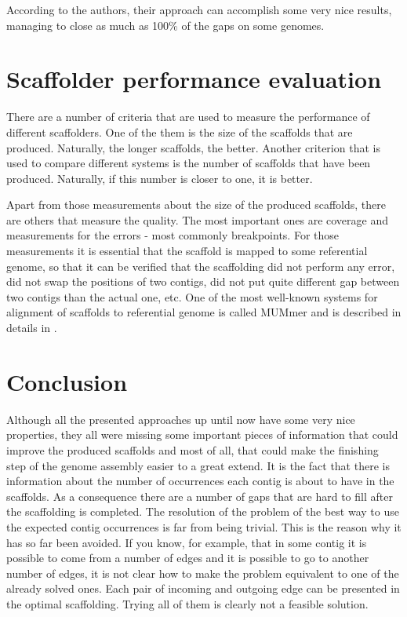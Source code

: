 \documentclass[11pt]{article}
\begin{document}
According to the authors, their approach can accomplish some very nice results,
managing to close as much as 100\% of the gaps on some genomes.


\section{Scaffolder performance evaluation} %
\label{sec:Scaffolder performance evaluation}
There are a number of criteria that are used to measure the performance of
different scaffolders. One of the them is the size of the scaffolds that are
produced. Naturally, the longer scaffolds, the better. Another criterion that is
used to compare different systems is the number of scaffolds that have been
produced. Naturally, if this number is closer to one, it is better. 

Apart from those measurements about the size of the produced scaffolds, there
are others that measure the quality. The most important ones are coverage and
measurements for the errors - most commonly breakpoints. For those measurements
it is essential that the scaffold is mapped to some referential genome, so that
it can be verified that the scaffolding did not perform any error, did not swap
the positions of two contigs, did not put quite different gap between two
contigs than the actual one, etc. One of the most well-known systems for
alignment of scaffolds to referential genome is called MUMmer and is described
in details in \cite{MUMmer}. 

\section{Conclusion} %
\label{sec:Conclusion}
Although all the presented approaches up until now have some very nice
properties, they all were missing some important pieces of information that
could improve the produced scaffolds and most of all, that could make the
finishing step of the genome assembly easier to a great extend. It is the fact
that there is information about the number of occurrences each contig is about
to have in the scaffolds. As a consequence there are a number of gaps that are
hard to fill after the scaffolding is completed. The resolution of the problem
of the best way to use the expected contig occurrences is far from being
trivial. This is the reason why it has so far been avoided. If you know, for
example, that in some contig it is possible to come from a number of edges and
it is possible to go to another number of edges, it is not clear how to make the
problem equivalent to one of the already solved ones. Each pair of incoming and
outgoing edge can be presented in the optimal scaffolding. Trying all of them is
clearly not a feasible solution.
\end{document}
